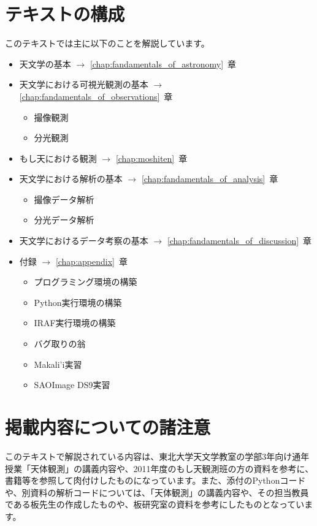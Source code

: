 \section{テキストの構成} %
\label{sect:text_program}
このテキストでは主に以下のことを解説しています。
\begin{itemize}
  \item 天文学の基本 $\rightarrow$ \ref{chap:fandamentals_of_astronomy}~章
  \item 天文学における可視光観測の基本 $\rightarrow$ \ref{chap:fandamentals_of_observations}~章
  \begin{itemize}
    \item 撮像観測
    \item 分光観測
  \end{itemize}
  \item もし天における観測 $\rightarrow$ \ref{chap:moshiten}~章
  \item 天文学における解析の基本 $\rightarrow$ \ref{chap:fandamentals_of_analysis}~章
  \begin{itemize}
    \item 撮像データ解析
    \item 分光データ解析
  \end{itemize}
  \item 天文学におけるデータ考察の基本 $\rightarrow$ \ref{chap:fandamentals_of_discussion}~章
  \item 付録 $\rightarrow$ \ref{chap:appendix}~章
  \begin{itemize}
    \item プログラミング環境の構築
    \item Python実行環境の構築
    \item IRAF実行環境の構築
    \item バグ取りの翁
    \item Makali'i実習
    \item SAOImage DS9実習
  \end{itemize}
\end{itemize}

\section{掲載内容についての諸注意} %
\label{sect:caution}
このテキストで解説されている内容は、東北大学天文学教室の学部3年向け通年授業「天体観測」の講義内容や、2011年度のもし天観測班の方の資料を参考に、書籍等を参照して肉付けしたものになっています。また、添付のPythonコードや、別資料の解析コードについては、「天体観測」の講義内容や、その担当教員である板先生の作成したものや、板研究室の資料を参考にしたものとなっています。

